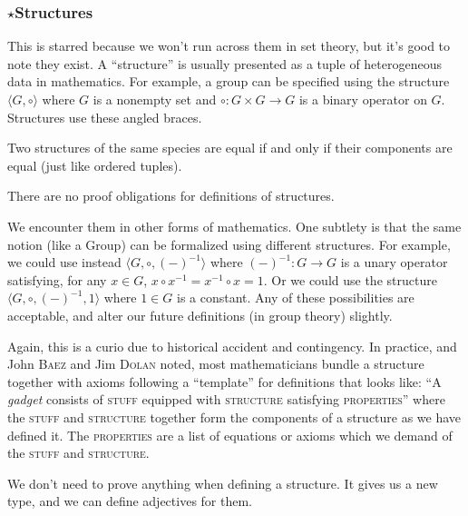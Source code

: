 \subsubsection{$\star$Structures}
This is starred because we won't run across them in set theory, but it's
good to note they exist. A ``structure'' is usually presented as a tuple
of heterogeneous data in mathematics. For example, a group can be
specified using the structure $\langle G,\circ\rangle$ where $G$ is a
nonempty set and $\circ\colon G\times G\to G$ is a binary operator on $G$.
Structures use these angled braces.

Two structures of the same species are equal if and only if their
components are equal (just like ordered tuples).

There are no proof obligations for definitions of structures.

We encounter them in other forms of mathematics. One subtlety is that
the same notion (like a Group) can be formalized using different
structures. For example, we could use instead $\langle G,\circ,(-)^{-1}\rangle$
where $(-)^{-1}\colon G\to G$ is a unary operator satisfying, for any
$x\in G$, $x\circ x^{-1}=x^{-1}\circ x=1$. Or we could use the structure
$\langle G,\circ,(-)^{-1},1\rangle$ where $1\in G$ is a constant. Any of
these possibilities are acceptable, and alter our future definitions (in
group theory) slightly.

Again, this is a curio due to historical accident and contingency. In
practice, and John \textsc{Baez} and Jim \textsc{Dolan} noted, most
mathematicians bundle a structure together with axioms following a
``template'' for definitions that looks like: ``A \textit{gadget}
consists of \textsc{stuff} equipped with \textsc{structure} satisfying
\textsc{properties}'' where the \textsc{stuff} and \textsc{structure}
together form the components of a structure as we have defined it. The
\textsc{properties} are a list of equations or axioms which we demand of
the \textsc{stuff} and \textsc{structure}.

We don't need to prove anything when defining a structure. It gives us a
new type, and we can define adjectives for them.

